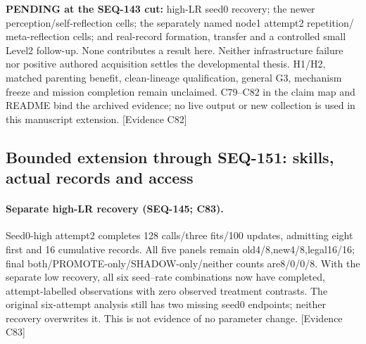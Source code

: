 \documentclass{article}
\begin{document}
\noindent\textbf{PENDING at the SEQ-143 cut:} high-LR seed0 recovery; the newer
perception/self-reflection cells; the separately named node1 attempt2 repetition/
meta-reflection cells; and real-record formation, transfer and a controlled
small Level2 follow-up. None contributes a result here. Neither infrastructure
failure nor positive authored acquisition settles the developmental thesis.
H1/H2, matched parenting benefit, clean-lineage qualification, general G3,
mechanism freeze and mission completion remain unclaimed. C79--C82 in the claim
map and README bind the archived evidence; no live output or new collection is
used in this manuscript extension. \textsf{[Evidence C82]}


\subsection{Bounded extension through SEQ-151: skills, actual records and access}
\label{sec:seq151-extension}
\paragraph{Separate high-LR recovery (SEQ-145; C83).}
Seed0-high attempt2 completes 128 calls/three fits/100 updates, admitting eight
first and 16 cumulative records. All five panels remain old4/8,new4/8,legal16/16;
final both/PROMOTE-only/SHADOW-only/neither counts are8/0/0/8. With the separate
low recovery, all six seed--rate combinations now have completed, attempt-labelled
observations with zero observed treatment contrasts. The original six-attempt
analysis still has two missing seed0 endpoints; neither recovery overwrites it.
This is not evidence of no parameter change. \textsf{[Evidence C83]}
\end{document}
